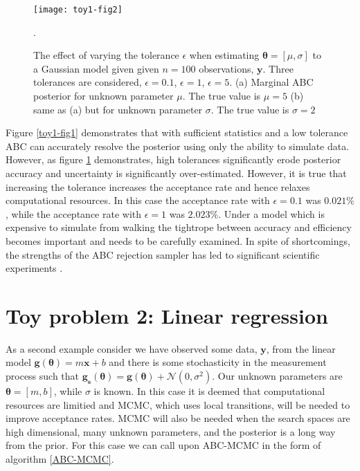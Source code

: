\begin{figure}[H]
	\centering
	\texttt{[image: toy1-fig2]}
	\caption{The effect of varying the tolerance $\epsilon$ when estimating $\bm{\theta} = [\mu,\sigma]$ to a Gaussian model given given $n = 100$ observations, $\bm{y}$. Three tolerances are considered, $\epsilon = 0.1$, $\epsilon = 1$, $\epsilon = 5$. (a) Marginal ABC posterior for unknown parameter $\mu$. The true value is $\mu = 5$ (b) same as (a) but for unknown parameter $\sigma$. The true value is $\sigma = 2$}.
	\label{toy1-fig2}
\end{figure}

Figure \ref{toy1-fig1} demonstrates that with sufficient statistics and a low tolerance ABC can accurately resolve the posterior using only the ability to simulate data. However, as figure \ref{toy1-fig2} demonstrates, high tolerances significantly erode posterior accuracy and uncertainty is significantly over-estimated. However, it is true that increasing the tolerance increases the acceptance rate and hence relaxes computational resources. In this case the acceptance rate with $\epsilon = 0.1$ was $0.021\%$, while the acceptance rate with $\epsilon = 1$ was $2.023\%$. Under a model which is expensive to simulate from walking the tightrope between accuracy and efficiency becomes important and needs to be carefully examined. In spite of shortcomings, the strengths of the ABC rejection sampler has led to significant scientific experiments \citep{Fu1997,Weiss1998a,Pritchard1999a}.

\section{Toy problem 2: Linear regression}
As a second example consider we have observed some data, $\bm{y}$, from the linear model $\bm{g}(\bm{\theta}) = m\bm{x} + b$ and there is some stochasticity in the measurement process such that $\bm{g_s}(\bm{\theta}) = \bm{g}(\bm{\theta}) + \mathcal{N}(0,\sigma^2)$. Our unknown parameters are $\bm{\theta} = [m,b]$, while $\sigma$ is known. In this case it is deemed that computational resources are limitied and MCMC, which uses local transitions, will be needed to improve acceptance rates. MCMC will also be needed when the search spaces are high dimensional, many unknown parameters, and the posterior is a long way from the prior. For this case we can call upon ABC-MCMC in the form of algorithm \ref{ABC-MCMC}. \\

